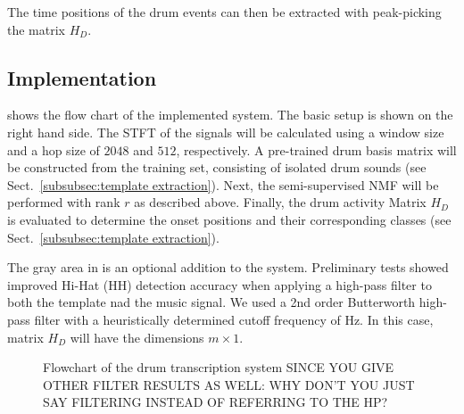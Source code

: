 \documentclass{article}
\begin{document}
The time positions of the drum events can then be extracted with peak-picking the matrix $H_D$.

\subsection{Implementation}\label{subsec:processing steps}

 shows the flow chart of the implemented system. The basic setup is shown on the right hand side. 
The STFT of the signals will be calculated using a window size and a hop size of $2048$ and $512$, respectively. 
A pre-trained drum basis matrix will be constructed from the training set, consisting of isolated drum sounds (see Sect.~\ref{subsubsec:template extraction}). 
Next, the semi-supervised NMF will be performed with rank $r$ as described above. 
Finally, the drum activity Matrix $H_D$ is evaluated to determine the onset positions and their corresponding classes  (see Sect.~\ref{subsubsec:template extraction}).  

The gray area in  is an optional addition to the system. Preliminary tests showed improved Hi-Hat (HH) detection accuracy when applying a high-pass filter to both the template nad the music signal. We used a 2nd order Butterworth high-pass filter with a heuristically determined cutoff frequency of \unit[8000]{Hz}. In this case, matrix $H_D$ will have the dimensions $m \times 1$. 

\begin{figure}
 \centerline{}
 \caption{Flowchart of the drum transcription system SINCE YOU GIVE OTHER FILTER RESULTS AS WELL: WHY DON'T YOU JUST SAY FILTERING INSTEAD OF REFERRING TO THE HP?}
 \label{fig:flowchart}
\end{figure}
\end{document}
